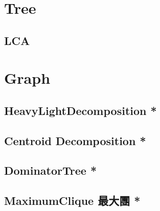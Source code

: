 \documentclass[a4paper,10pt,twocolumn,oneside]{article}
\begin{document}
%

% 

% 

\section{Tree}

\subsection{LCA}


\section{Graph}

\subsection{HeavyLightDecomposition *}


\subsection{Centroid Decomposition *}


\subsection{DominatorTree *}


\subsection{MaximumClique 最大團 *}

% 
\end{document}
